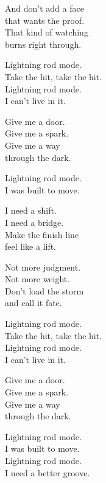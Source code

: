 \begin{lyrics}
And don’t add a face\\
that wants the proof.\\
That kind of watching\\
burns right through.

Lightning rod mode.\\
Take the hit, take the hit.\\
Lightning rod mode.\\
I can’t live in it.

Give me a door.\\
Give me a spark.\\
Give me a way\\
through the dark.

Lightning rod mode.\\
I was built to move.

I need a shift.\\
I need a bridge.\\
Make the finish line\\
feel like a lift.

Not more judgment.\\
Not more weight.\\
Don’t load the storm\\
and call it fate.

Lightning rod mode.\\
Take the hit, take the hit.\\
Lightning rod mode.\\
I can’t live in it.

Give me a door.\\
Give me a spark.\\
Give me a way\\
through the dark.

Lightning rod mode.\\
I was built to move.\\
Lightning rod mode.\\
I need a better groove.

\end{lyrics}

